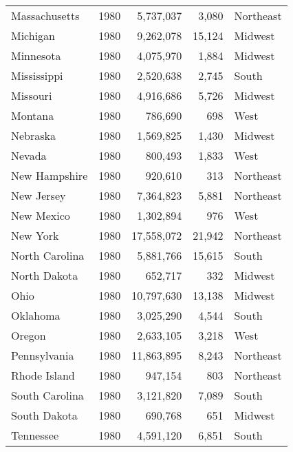 \documentclass{exam}
\begin{document}
\begin{tabular}{lrrrl}
      Massachusetts  & 1980 & 5,737,037        & 3,080             & Northeast \\
      Michigan       & 1980 & 9,262,078        & 15,124            & Midwest \\
      Minnesota      & 1980 & 4,075,970        & 1,884             & Midwest \\
      Mississippi    & 1980 & 2,520,638        & 2,745             & South \\
      Missouri       & 1980 & 4,916,686        & 5,726             & Midwest \\
      Montana        & 1980 & 786,690          & 698               & West \\
      Nebraska       & 1980 & 1,569,825        & 1,430             & Midwest \\
      Nevada         & 1980 & 800,493          & 1,833             & West \\
      New Hampshire  & 1980 & 920,610          & 313               & Northeast \\
      New Jersey     & 1980 & 7,364,823        & 5,881             & Northeast \\
      New Mexico     & 1980 & 1,302,894        & 976               & West \\
      New York       & 1980 & 17,558,072       & 21,942            & Northeast \\
      North Carolina & 1980 & 5,881,766        & 15,615            & South \\
      North Dakota   & 1980 & 652,717          & 332               & Midwest \\
      Ohio           & 1980 & 10,797,630       & 13,138            & Midwest \\
      Oklahoma       & 1980 & 3,025,290        & 4,544             & South \\
      Oregon         & 1980 & 2,633,105        & 3,218             & West \\
      Pennsylvania   & 1980 & 11,863,895       & 8,243             & Northeast \\
      Rhode Island   & 1980 & 947,154          & 803               & Northeast \\
      South Carolina & 1980 & 3,121,820        & 7,089             & South \\
      South Dakota   & 1980 & 690,768          & 651               & Midwest \\
      Tennessee      & 1980 & 4,591,120        & 6,851             & South \\

\end{tabular}
\end{document}
